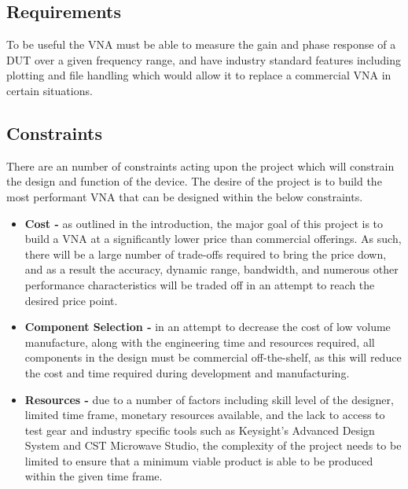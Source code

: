 \subsection{Requirements}
\label{subsec:requirements}
To be useful the VNA must be able to measure the gain and phase response of a DUT over a given frequency range, and have industry standard features including plotting and file handling which would allow it to replace a commercial VNA in certain situations. 

\subsection{Constraints}
\label{subsec:contraints}
There are an number of constraints acting upon the project which will constrain the design and function of the device. The desire of the project is to build the most performant VNA that can be designed within the below constraints. 

\begin{itemize}
	\item \textbf{Cost -} as outlined in the introduction, the major goal of this project is to build a VNA at a significantly lower price than commercial offerings. As such, there will be a large number of trade-offs required to bring the price down, and as a result the accuracy, dynamic range, bandwidth, and numerous other performance characteristics will be traded off in an attempt to reach the desired price point.
	\item \textbf{Component Selection -} in an attempt to decrease the cost of low volume manufacture, along with the engineering time and resources required, all components in the design must be commercial off-the-shelf, as this will reduce the cost and time required during development and manufacturing. 
	\item \textbf{Resources -} due to a number of factors including skill level of the designer, limited time frame, monetary resources available, and the lack to access to test gear and industry specific tools such as Keysight's Advanced Design System and CST Microwave Studio, the complexity of the project needs to be limited to ensure that a minimum viable product is able to be produced within the given time frame.   
\end{itemize}

